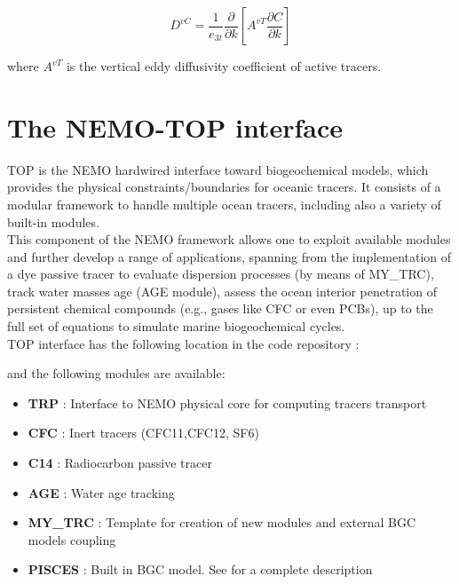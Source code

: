 \documentclass[../main/TOP_manual]{subfiles}
\begin{document}
\begin{equation}
D^{vC} =  \frac{1}{e_{3t}} \frac{\partial}{\partial k} \left[  A^{vT} \frac{\partial C}{\partial k} \right]
\label{Eq_trczdf}
\end{equation}

where $A^{vT}$ is the vertical eddy diffusivity coefficient of active tracers.

\section{The NEMO-TOP interface}
\label{sec:TopInt}

TOP is the NEMO hardwired interface toward biogeochemical models, which provides the physical constraints/boundaries for oceanic tracers.
It consists of a modular framework to handle multiple ocean tracers, including also a variety of built-in modules. \\

This component of the NEMO framework allows one to exploit available modules and further develop a range of applications, spanning from the implementation of a dye passive tracer to evaluate dispersion processes (by means of MY\_TRC), track water masses age (AGE module), assess the ocean interior penetration of persistent chemical compounds (e.g., gases like CFC or even PCBs), up to the full set of equations to simulate marine biogeochemical cycles. \\

TOP interface has the following location in the code repository : 

and the following modules are available:

\begin{itemize}
        \item \textbf{TRP}    	 :    Interface to NEMO physical core for computing tracers transport
        \item \textbf{CFC}	 :    Inert tracers (CFC11,CFC12, SF6)
        \item \textbf{C14}	 :    Radiocarbon passive tracer
        \item \textbf{AGE}	 :    Water age tracking
        \item \textbf{MY\_TRC}   :    Template for creation of new modules and external BGC models coupling
        \item \textbf{PISCES}    :    Built in BGC model. See \cite{aumont_2015} for a complete description
\end{itemize}
\end{document}
